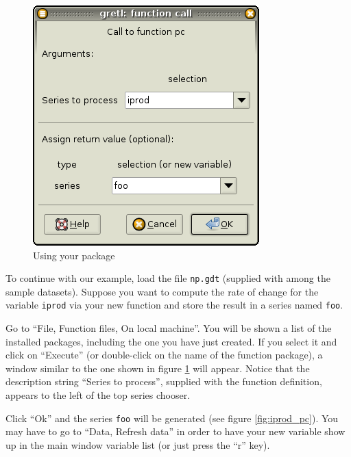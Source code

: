 \begin{figure}[htbp]
  \centering
  \includegraphics[scale=0.5]{figures/function_call}
  \caption{Using your package}
  \label{fig:function_call}
\end{figure}

To continue with our example, load the file \texttt{np.gdt} (supplied
with  among the sample datasets). Suppose you want to
compute the rate of change for the variable \texttt{iprod} via your
new function and store the result in a series named \texttt{foo}.

Go to ``File, Function files, On local machine''.  You will be shown a
list of the installed packages, including the one you have just
created. If you select it and click on ``Execute'' (or double-click on
the name of the function package), a window similar to the one shown
in figure \ref{fig:function_call} will appear.  Notice that the
description string ``Series to process'', supplied with the function
definition, appears to the left of the top series chooser.

Click ``Ok'' and the
series \texttt{foo} will be generated (see figure \ref{fig:iprod_pc}).
You may have to go to ``Data, Refresh data'' in order to have your new
variable show up in the main window variable list (or just press the
``r'' key).

